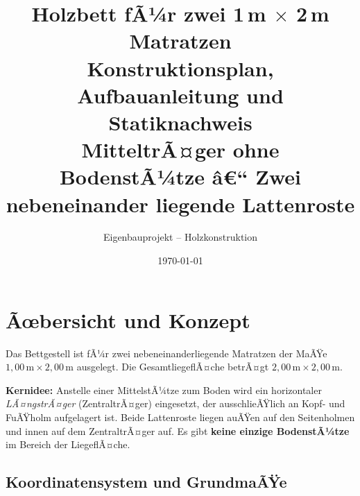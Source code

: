 ﻿\documentclass[12pt,a4paper]{article}
\title{
  \vspace{-1cm}
  {\LARGE \textbf{Holzbett fÃ¼r zwei 1\,m $\times$ 2\,m Matratzen}}\\[0.5em]
  {\large Konstruktionsplan, Aufbauanleitung und Statiknachweis}\\[0.3em]
  {\normalsize MitteltrÃ¤ger ohne BodenstÃ¼tze â€“ Zwei nebeneinander liegende Lattenroste}
}
\author{Eigenbauprojekt -- Holzkonstruktion}
\date{\today}
\theoremstyle{definition}
\theoremstyle{plain}
\theoremstyle{remark}
\begin{document}
\maketitle
\thispagestyle{fancy}

\tableofcontents
\newpage

\section{Ãœbersicht und Konzept}

Das Bettgestell ist fÃ¼r zwei nebeneinanderliegende Matratzen der MaÃŸe
$1{,}00\,\text{m} \times 2{,}00\,\text{m}$ ausgelegt. Die GesamtliegeflÃ¤che
betrÃ¤gt $2{,}00\,\text{m} \times 2{,}00\,\text{m}$.

\medskip
\textbf{Kernidee:} Anstelle einer MittelstÃ¼tze zum Boden wird ein horizontaler
\emph{LÃ¤ngstrÃ¤ger} (ZentraltrÃ¤ger) eingesetzt, der ausschlieÃŸlich an Kopf- und
FuÃŸholm aufgelagert ist. Beide Lattenroste liegen auÃŸen auf den Seitenholmen
und innen auf dem ZentraltrÃ¤ger auf. Es gibt \textbf{keine einzige
BodenstÃ¼tze} im Bereich der LiegeflÃ¤che.

\subsection{Koordinatensystem und GrundmaÃŸe}
\end{document}
